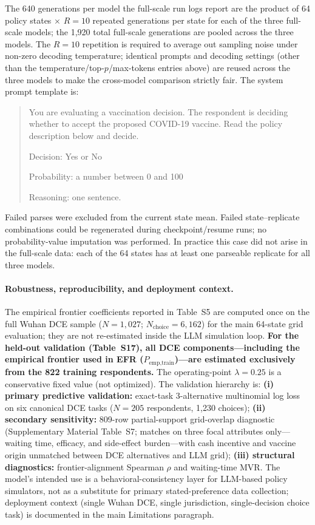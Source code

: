 \documentclass[11pt]{article}
\begin{document}
The 640 generations per model the full-scale run logs report are the product of 64 policy states $\times$ $R=10$ repeated generations per state for each of the three full-scale models; the 1{,}920 total full-scale generations are pooled across the three models. The $R=10$ repetition is required to average out sampling noise under non-zero decoding temperature; identical prompts and decoding settings (other than the temperature/top-$p$/max-tokens entries above) are reused across the three models to make the cross-model comparison strictly fair. The system prompt template is:

\begin{quote}\small\ttfamily
You are evaluating a vaccination decision. The respondent is deciding whether to accept the proposed COVID-19 vaccine. Read the policy description below and decide.

Decision: Yes or No

Probability: a number between 0 and 100

Reasoning: one sentence.
\end{quote}

Failed parses were excluded from the current state mean. Failed state--replicate combinations could be regenerated during checkpoint/resume runs; no probability-value imputation was performed. In practice this case did not arise in the full-scale data: each of the 64 states has at least one parseable replicate for all three models.

\paragraph{Robustness, reproducibility, and deployment context.}
The empirical frontier coefficients reported in Table~S5 are computed once on the full Wuhan DCE sample ($N = 1{,}027$; $N_{\text{choice}} = 6{,}162$) for the main 64-state grid evaluation; they are not re-estimated inside the LLM simulation loop. \textbf{For the held-out validation (Table~S17), all DCE components---including the empirical frontier used in EFR ($P_{\text{emp,train}}$)---are estimated exclusively from the 822 training respondents.} The operating-point $\lambda=0.25$ is a conservative fixed value (not optimized). The validation hierarchy is: \textbf{(i) primary predictive validation:} exact-task 3-alternative multinomial log loss on six canonical DCE tasks ($N = 205$ respondents, 1,230 choices); \textbf{(ii) secondary sensitivity:} 809-row partial-support grid-overlap diagnostic (Supplementary Material Table~S7; matches on three focal attributes only---waiting time, efficacy, and side-effect burden---with cash incentive and vaccine origin unmatched between DCE alternatives and LLM grid); \textbf{(iii) structural diagnostics:} frontier-alignment Spearman $\rho$ and waiting-time MVR. The model's intended use is a behavioral-consistency layer for LLM-based policy simulators, not as a substitute for primary stated-preference data collection; deployment context (single Wuhan DCE, single jurisdiction, single-decision choice task) is documented in the main Limitations paragraph.
\end{document}

